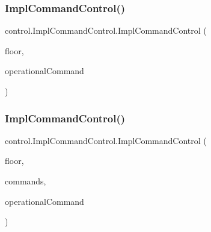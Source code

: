 \subsubsection{\texorpdfstring{ImplCommandControl()}{ImplCommandControl()}\hspace{0.1cm}{\footnotesize\ttfamily [1/3]}}
{\footnotesize\ttfamily control.\+Impl\+Command\+Control.\+Impl\+Command\+Control (\begin{DoxyParamCaption}\item[{int}]{floor,  }\item[{\mbox{\hyperlink{interfacecontrol_1_1_operational_command}{Operational\+Command}}}]{operational\+Command }\end{DoxyParamCaption})}

\mbox{\label{classcontrol_1_1_impl_command_control_a57ac3479e6a08c522404266b3078db16}} 
\subsubsection{\texorpdfstring{ImplCommandControl()}{ImplCommandControl()}\hspace{0.1cm}{\footnotesize\ttfamily [2/3]}}
{\footnotesize\ttfamily control.\+Impl\+Command\+Control.\+Impl\+Command\+Control (\begin{DoxyParamCaption}\item[{int}]{floor,  }\item[{Navigable\+Set$<$ \mbox{\hyperlink{classcontrol_1_1command_1_1_floor_request}{Floor\+Request}} $>$}]{commands,  }\item[{\mbox{\hyperlink{interfacecontrol_1_1_operational_command}{Operational\+Command}}}]{operational\+Command }\end{DoxyParamCaption})}

\mbox{\label{classcontrol_1_1_impl_command_control_a384f52aa39c3a5745b9143d6763e36a9}} 

